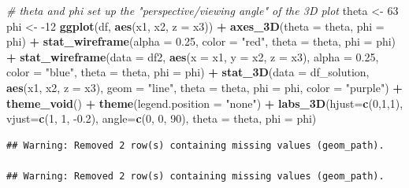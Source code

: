 \documentclass[
]{book}
\newenvironment{Shaded}{\begin{snugshade}}{\end{snugshade}}
\newcommand{\CommentTok}[1]{\textcolor[rgb]{0.56,0.35,0.01}{\textit{#1}}}
\newcommand{\DataTypeTok}[1]{\textcolor[rgb]{0.13,0.29,0.53}{#1}}
\newcommand{\DecValTok}[1]{\textcolor[rgb]{0.00,0.00,0.81}{#1}}
\newcommand{\FloatTok}[1]{\textcolor[rgb]{0.00,0.00,0.81}{#1}}
\newcommand{\KeywordTok}[1]{\textcolor[rgb]{0.13,0.29,0.53}{\textbf{#1}}}
\newcommand{\NormalTok}[1]{#1}
\newcommand{\OperatorTok}[1]{\textcolor[rgb]{0.81,0.36,0.00}{\textbf{#1}}}
\newcommand{\StringTok}[1]{\textcolor[rgb]{0.31,0.60,0.02}{#1}}
\theoremstyle{definition}
\theoremstyle{definition}
\theoremstyle{definition}
\theoremstyle{definition}
\theoremstyle{remark}
\begin{document}
\begin{Shaded}
\begin{Highlighting}[]
\CommentTok{# theta and phi set up the "perspective/viewing angle" of the 3D plot}
\NormalTok{theta <-}\StringTok{ }\DecValTok{63}
\NormalTok{phi <-}\StringTok{ }\DecValTok{-12}
\KeywordTok{ggplot}\NormalTok{(df, }\KeywordTok{aes}\NormalTok{(x1, x2, }\DataTypeTok{z =}\NormalTok{ x3)) }\OperatorTok{+}
\StringTok{    }\KeywordTok{axes_3D}\NormalTok{(}\DataTypeTok{theta =}\NormalTok{ theta, }\DataTypeTok{phi =}\NormalTok{ phi) }\OperatorTok{+}
\StringTok{    }\KeywordTok{stat_wireframe}\NormalTok{(}\DataTypeTok{alpha =} \FloatTok{0.25}\NormalTok{, }\DataTypeTok{color =} \StringTok{"red"}\NormalTok{, }\DataTypeTok{theta =}\NormalTok{ theta, }\DataTypeTok{phi =}\NormalTok{ phi) }\OperatorTok{+}
\StringTok{    }\KeywordTok{stat_wireframe}\NormalTok{(}\DataTypeTok{data =}\NormalTok{ df2, }\KeywordTok{aes}\NormalTok{(}\DataTypeTok{x =}\NormalTok{ x1, }\DataTypeTok{y =}\NormalTok{ x2, }\DataTypeTok{z =}\NormalTok{ x3), }\DataTypeTok{alpha =} \FloatTok{0.25}\NormalTok{, }\DataTypeTok{color =} \StringTok{"blue"}\NormalTok{, }\DataTypeTok{theta =}\NormalTok{ theta, }\DataTypeTok{phi =}\NormalTok{ phi) }\OperatorTok{+}
\StringTok{    }\KeywordTok{stat_3D}\NormalTok{(}\DataTypeTok{data =}\NormalTok{ df_solution, }\KeywordTok{aes}\NormalTok{(x1, x2, }\DataTypeTok{z =}\NormalTok{ x3), }\DataTypeTok{geom =} \StringTok{"line"}\NormalTok{, }\DataTypeTok{theta =}\NormalTok{ theta, }\DataTypeTok{phi =}\NormalTok{ phi, }\DataTypeTok{color =} \StringTok{"purple"}\NormalTok{) }\OperatorTok{+}
\StringTok{    }\KeywordTok{theme_void}\NormalTok{() }\OperatorTok{+}
\StringTok{    }\KeywordTok{theme}\NormalTok{(}\DataTypeTok{legend.position =} \StringTok{"none"}\NormalTok{) }\OperatorTok{+}
\StringTok{    }\KeywordTok{labs_3D}\NormalTok{(}\DataTypeTok{hjust=}\KeywordTok{c}\NormalTok{(}\DecValTok{0}\NormalTok{,}\DecValTok{1}\NormalTok{,}\DecValTok{1}\NormalTok{), }\DataTypeTok{vjust=}\KeywordTok{c}\NormalTok{(}\DecValTok{1}\NormalTok{, }\DecValTok{1}\NormalTok{, }\FloatTok{-0.2}\NormalTok{), }\DataTypeTok{angle=}\KeywordTok{c}\NormalTok{(}\DecValTok{0}\NormalTok{, }\DecValTok{0}\NormalTok{, }\DecValTok{90}\NormalTok{), }\DataTypeTok{theta =}\NormalTok{ theta, }\DataTypeTok{phi =}\NormalTok{ phi) }
\end{Highlighting}
\end{Shaded}

\begin{verbatim}
## Warning: Removed 2 row(s) containing missing values (geom_path).

## Warning: Removed 2 row(s) containing missing values (geom_path).
\end{verbatim}
\end{document}

